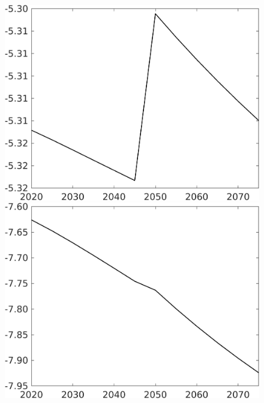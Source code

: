 \documentclass[12pt]{article}
\begin{document}
\begin{figure}[h!!]
\begin{minipage}[]{0.32\textwidth}
	\end{minipage}	
	\begin{minipage}[]{0.32\textwidth}
		\includegraphics[width=1\textwidth]{../../codding_model/own_basedOnFried/optimalPol_010922_revision/figures/all_13Sept22/CompTaufPER_bytaul_Reg0_hl_spillover0_nsk0_xgr0_knspil1_sep1_LFlimit1_emsbase0_countec0_GovRev0_etaa0.79_lgd0.png}
	\end{minipage}	
	\begin{minipage}[]{0.32\textwidth}
		\includegraphics[width=1\textwidth]{../../codding_model/own_basedOnFried/optimalPol_010922_revision/figures/all_13Sept22/CompTaufPER_bytaul_Reg0_C_spillover0_nsk0_xgr0_knspil1_sep1_LFlimit1_emsbase0_countec0_GovRev0_etaa0.79_lgd0.png}

\end{minipage}
\end{figure}
\end{document}
